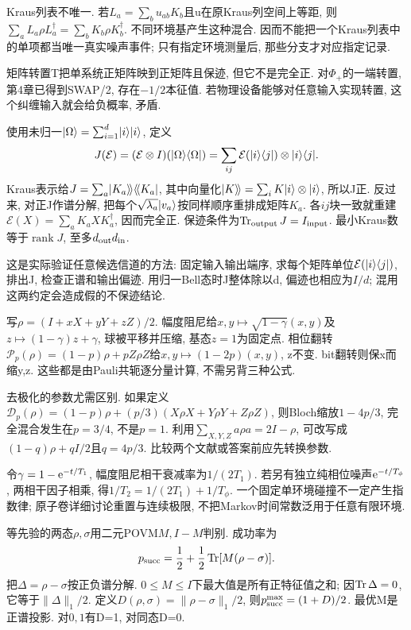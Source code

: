 Kraus列表不唯一. 若$L_a=\sum_bu_{ab}K_b$且u在原Kraus列空间上等距, 则$\sum_aL_a\rho L_a^\dagger=\sum_bK_b\rho K_b^\dagger$. 不同环境基产生这种混合. 因而不能把一个Kraus列表中的单项都当唯一真实噪声事件; 只有指定环境测量后, 那些分支才对应指定记录.

矩阵转置T把单系统正矩阵映到正矩阵且保迹, 但它不是完全正. 对$\Phi_+$的一端转置, 第4章已得到SWAP/2, 存在$-1/2$本征值. 若物理设备能够对任意输入实现转置, 这个纠缠输入就会给负概率, 矛盾.

使用未归一$\lvert \Omega\rangle=\sum_{i=1}^d\lvert i\rangle\lvert i\rangle$, 定义
\[J(\mathcal E)=(\mathcal E\otimes I)(\lvert \Omega\rangle\langle \Omega\rvert)
=\sum_{ij}\mathcal E(\lvert i\rangle\langle j\rvert)\otimes\lvert i\rangle\langle j\rvert.\]
Kraus表示给$J=\sum_a\lvert K_a\rangle\!\rangle\langle\!\langle K_a\rvert$, 其中向量化$\lvert K\rangle\!\rangle=\sum_iK\lvert i\rangle\otimes\lvert i\rangle$, 所以J正. 反过来, 对正J作谱分解, 把每个$\sqrt{\lambda_a}\lvert v_a\rangle$按同样顺序重排成矩阵$K_a$. 各$ij$块一致就重建$\mathcal E(X)=\sum_aK_aXK_a^\dagger$, 因而完全正. 保迹条件为$\operatorname{Tr}_{\rm output}J=I_{\rm input}$. 最小Kraus数等于$\operatorname{rank}J$, 至多$d_{\rm out}d_{\rm in}$.

这是实际验证任意候选信道的方法: 固定输入输出端序, 求每个矩阵单位$\mathcal E(\lvert i\rangle\langle j\rvert)$, 排出J, 检查正谱和输出偏迹. 用归一Bell态时J整体除以d, 偏迹也相应为$I/d$; 混用这两约定会造成假的不保迹结论.

写$\rho=(I+xX+yY+zZ)/2$. 幅度阻尼给$x,y\mapsto\sqrt{1-\gamma}(x,y)$及$z\mapsto(1-\gamma)z+\gamma$, 球被平移并压缩, 基态$z=1$为固定点. 相位翻转$\mathcal P_p(\rho)=(1-p)\rho+pZ\rho Z$给$x,y\mapsto(1-2p)(x,y)$, z不变. bit翻转则保x而缩y,z. 这些都是由Pauli共轭逐分量计算, 不需另背三种公式.

去极化的参数尤需区别. 如果定义$\mathcal D_p(\rho)=(1-p)\rho+(p/3)(X\rho X+Y\rho Y+Z\rho Z)$, 则Bloch缩放$1-4p/3$, 完全混合发生在$p=3/4$, 不是$p=1$. 利用$\sum_{X,Y,Z}a\rho a=2I-\rho$, 可改写成$(1-q)\rho+qI/2$且$q=4p/3$. 比较两个文献或答案前应先转换参数.

令$\gamma=1-\mathrm e^{-t/T_1}$, 幅度阻尼相干衰减率为$1/(2T_1)$. 若另有独立纯相位噪声$\mathrm e^{-t/T_\phi}$, 两相干因子相乘, 得$1/T_2=1/(2T_1)+1/T_\phi$. 一个固定单环境碰撞不一定产生指数律; 原子卷详细讨论重置与连续极限, 不把Markov时间常数泛用于任意有限环境.

等先验的两态$\rho,\sigma$用二元POVM$M,I-M$判别. 成功率为
\[p_{\rm succ}=\frac12+\frac12\operatorname{Tr}[M(\rho-\sigma)].\]
把$\Delta=\rho-\sigma$按正负谱分解. $0\le M\le I$下最大值是所有正特征值之和; 因$\operatorname{Tr}\Delta=0$, 它等于$\|\Delta\|_1/2$. 定义$D(\rho,\sigma)=\|\rho-\sigma\|_1/2$, 则$p_{\rm succ}^{\max}=(1+D)/2$. 最优M是正谱投影. 对$0,1$有D=1, 对同态D=0.


